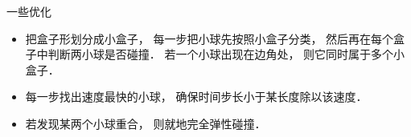 
一些优化
\begin{itemize}
\item 把盒子形划分成小盒子， 每一步把小球先按照小盒子分类， 然后再在每个盒子中判断两小球是否碰撞． 若一个小球出现在边角处， 则它同时属于多个小盒子．
\item 每一步找出速度最快的小球， 确保时间步长小于某长度除以该速度．
\item 若发现某两个小球重合， 则就地完全弹性碰撞．
\end{itemize}

